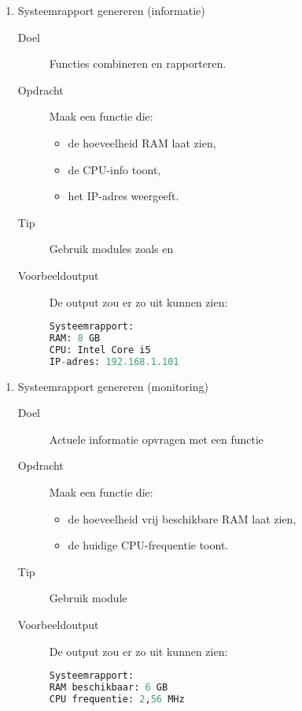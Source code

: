 \begin{enumerate}
\item Systeemrapport genereren (informatie)
	\begin{description}
	\item[Doel] Functies combineren en rapporteren.
	\item[Opdracht] Maak een functie  die:
		\begin{itemize}
		\item de hoeveelheid RAM laat zien,
		\item de CPU-info toont,
		\item het IP-adres weergeeft.
		\end{itemize}
	\item[Tip] Gebruik modules zoals  en 
	\item[Voorbeeldoutput] De output zou er zo uit kunnen zien:
\begin{lstlisting}[language=python]
Systeemrapport:
RAM: 8 GB
CPU: Intel Core i5
IP-adres: 192.168.1.101
\end{lstlisting}
	\end{description}
\end{enumerate}

\begin{enumerate}
\item Systeemrapport genereren (monitoring)
	\begin{description}
	\item[Doel] Actuele informatie opvragen met een functie
	\item[Opdracht] Maak een functie  die:
		\begin{itemize}
		\item de hoeveelheid vrij beschikbare RAM laat zien,
		\item de huidige CPU-frequentie toont.
		\end{itemize}
	\item[Tip] Gebruik module 
	\item[Voorbeeldoutput] De output zou er zo uit kunnen zien:
\begin{lstlisting}[language=python]
Systeemrapport:
RAM beschikbaar: 6 GB
CPU frequentie: 2,56 MHz
\end{lstlisting}
	\end{description}
\end{enumerate}

